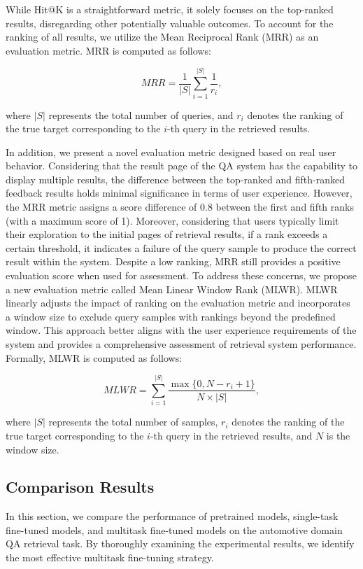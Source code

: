 \documentclass[mathematics,article,submit,moreauthors]{Definitions/mdpi}
\newcommand{\1}[1]{\mathds{1}\left[#1\right]}
\begin{document}
While Hit@K is a straightforward metric, it solely focuses on the top-ranked results, disregarding other potentially valuable outcomes. To account for the ranking of all results, we utilize the Mean Reciprocal Rank (MRR) as an evaluation metric. MRR is computed as follows:
\begin{linenomath}
	\begin{equation}\label{eq:mrr}
		MRR = \frac{1}{|S|}\sum_{i=1}^{|S|}\frac{1}{r_i}, 
	\end{equation}
\end{linenomath}
where $|S|$ represents the total number of queries, and $r_i$ denotes the ranking of the true target corresponding to the $i$-th query in the retrieved  results.

In addition, we present a novel evaluation metric designed based on real user behavior. Considering that the result page of the QA system  has the capability to display multiple results, the difference between the top-ranked and fifth-ranked feedback results holds minimal significance in terms of user experience. However, the MRR metric assigns a score difference of 0.8 between the first and fifth ranks (with a maximum score of 1). 
Moreover, considering that users typically limit their exploration to the initial pages of retrieval results, if a rank exceeds a certain threshold, it indicates a failure of the query sample to produce the correct result within the system. Despite a low ranking, MRR still provides a positive evaluation score when used for assessment. To address these concerns, we propose a new evaluation metric called Mean Linear Window Rank (MLWR). MLWR linearly adjusts the impact of ranking on the evaluation metric and incorporates a window size to exclude query samples with rankings beyond the predefined window. This approach better aligns with the user experience requirements of the system and provides a comprehensive assessment of retrieval system performance. Formally, MLWR is computed as follows:
\begin{linenomath}
	\begin{equation}\label{eq:mlwr}
		MLWR = \sum_{i=1}^{|S|}\frac{\max\{0, N-r_i+1\}}{N\times |S|}, 
	\end{equation}
\end{linenomath}
where $|S|$ represents the total number of samples, $r_i$ denotes the ranking of the true target corresponding to the $i$-th query in the retrieved  results, and $N$ is the window size. 

\subsection{Comparison Results}
In this section, we compare the performance of pretrained models, single-task fine-tuned models, and multitask fine-tuned models on the automotive domain QA retrieval task. By thoroughly examining the experimental results, we identify the most effective multitask fine-tuning strategy.
\end{document}
